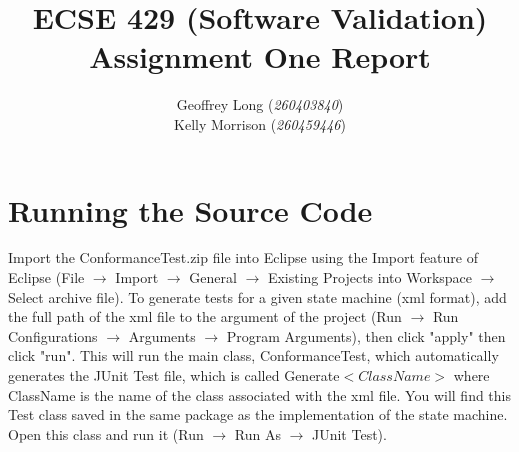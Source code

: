 \documentclass[11pt, a4paper]{article}
\title{ECSE 429 (Software Validation) \\ Assignment One Report}
\author{Geoffrey Long (\textit{260403840}) \\ Kelly Morrison (\textit{260459446})}
\begin{document}
\maketitle






\section{Running the Source Code}
Import the ConformanceTest.zip file into Eclipse using the Import feature of Eclipse (File $\rightarrow$ Import $\rightarrow$ General $\rightarrow$ Existing Projects into Workspace $\rightarrow$ Select archive file). To generate tests for a given state machine (xml format), add the full path of the xml file to the argument of the project (Run $\rightarrow$ Run Configurations $\rightarrow$ Arguments $\rightarrow$ Program Arguments), then click "apply" then click "run". This will run the main class, ConformanceTest, which automatically generates the JUnit Test file, which is called Generate$<ClassName>$ where ClassName is the name of the class associated with the xml file. You will find this Test class saved in the same package as the implementation of the state machine. Open this class and run it (Run $\rightarrow$ Run As $\rightarrow$ JUnit Test). 
\end{document}
